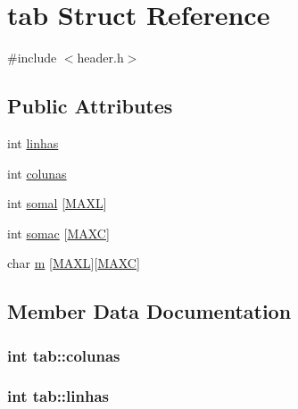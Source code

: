 \hypertarget{structtab}{}\section{tab Struct Reference}
\label{structtab}


{\ttfamily \#include $<$header.\+h$>$}

\subsection*{Public Attributes}
\begin{DoxyCompactItemize}
\item 
int \hyperlink{structtab_ab62d5cbb9fd5d3e3720ceb68d1ed3e5d}{linhas}
\item 
int \hyperlink{structtab_aaf2961706b9999bb81ddeceb810e9829}{colunas}
\item 
int \hyperlink{structtab_ade732448e5e2e708199c819645ba3d5f}{somal} \mbox{[}\hyperlink{header_8h_ac4041a19ac1fddefc2239437baecd8f5}{M\+A\+X\+L}\mbox{]}
\item 
int \hyperlink{structtab_a31d5202f825583424eafb395ad1c37ff}{somac} \mbox{[}\hyperlink{header_8h_a879e25d1a53f3b9894f442d2d54cecdc}{M\+A\+X\+C}\mbox{]}
\item 
char \hyperlink{structtab_aef5f60a83f454259252159d8570abbc5}{m} \mbox{[}\hyperlink{header_8h_ac4041a19ac1fddefc2239437baecd8f5}{M\+A\+X\+L}\mbox{]}\mbox{[}\hyperlink{header_8h_a879e25d1a53f3b9894f442d2d54cecdc}{M\+A\+X\+C}\mbox{]}
\end{DoxyCompactItemize}


\subsection{Member Data Documentation}
\hypertarget{structtab_aaf2961706b9999bb81ddeceb810e9829}{}
\subsubsection[{colunas}]{\setlength{\rightskip}{0pt plus 5cm}int tab\+::colunas}\label{structtab_aaf2961706b9999bb81ddeceb810e9829}
\hypertarget{structtab_ab62d5cbb9fd5d3e3720ceb68d1ed3e5d}{}
\subsubsection[{linhas}]{\setlength{\rightskip}{0pt plus 5cm}int tab\+::linhas}\label{structtab_ab62d5cbb9fd5d3e3720ceb68d1ed3e5d}
\hypertarget{structtab_aef5f60a83f454259252159d8570abbc5}{}
